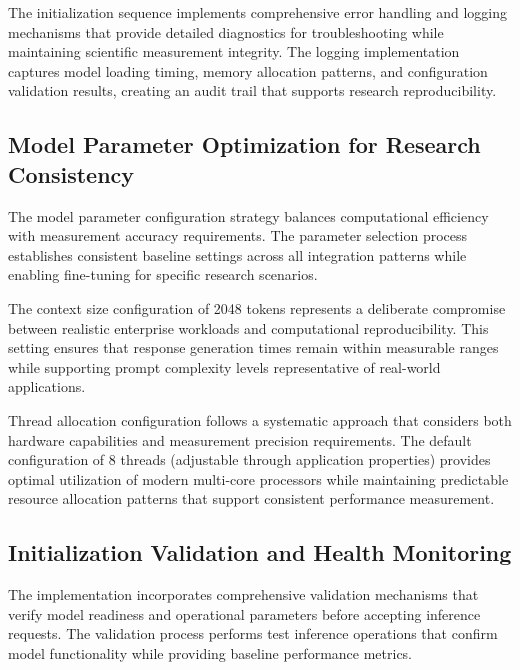The initialization sequence implements comprehensive error handling and logging mechanisms that provide detailed diagnostics for troubleshooting while maintaining scientific measurement integrity. The logging implementation captures model loading timing, memory allocation patterns, and configuration validation results, creating an audit trail that supports research reproducibility.

\subsection{Model Parameter Optimization for Research Consistency}

The model parameter configuration strategy balances computational efficiency with measurement accuracy requirements. The parameter selection process establishes consistent baseline settings across all integration patterns while enabling fine-tuning for specific research scenarios.


The context size configuration of 2048 tokens represents a deliberate compromise between realistic enterprise workloads and computational reproducibility. This setting ensures that response generation times remain within measurable ranges while supporting prompt complexity levels representative of real-world applications.

Thread allocation configuration follows a systematic approach that considers both hardware capabilities and measurement precision requirements. The default configuration of 8 threads (adjustable through application properties) provides optimal utilization of modern multi-core processors while maintaining predictable resource allocation patterns that support consistent performance measurement.

\subsection{Initialization Validation and Health Monitoring}

The implementation incorporates comprehensive validation mechanisms that verify model readiness and operational parameters before accepting inference requests. The validation process performs test inference operations that confirm model functionality while providing baseline performance metrics.


